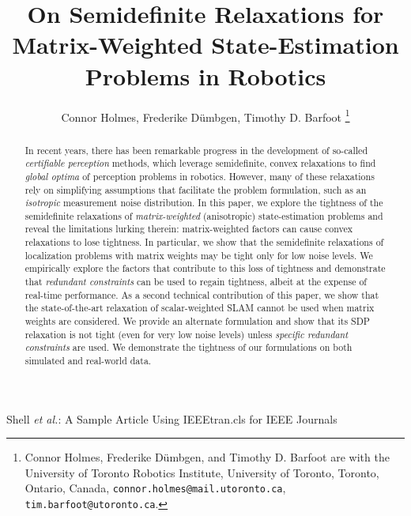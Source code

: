 \documentclass[lettersize,journal]{IEEEtran}
\begin{document}
\title{On Semidefinite Relaxations for Matrix-Weighted State-Estimation Problems in Robotics}

\author{Connor Holmes, Frederike D{\"u}mbgen, Timothy D. Barfoot\vspace*{-0.45in}
\thanks{Connor Holmes, Frederike D{\"u}mbgen, and Timothy D. Barfoot are with the University of Toronto Robotics Institute, University of Toronto, Toronto, Ontario, Canada, \texttt{connor.holmes@mail.utoronto.ca}, \texttt{tim.barfoot@utoronto.ca}.}}%

%
{Shell \MakeLowercase{\textit{et al.}}: A Sample Article Using IEEEtran.cls for IEEE Journals}




\maketitle

\begin{abstract}
In recent years, there has been remarkable progress in the development of so-called \emph{certifiable perception} methods, which leverage semidefinite, convex relaxations to find \emph{global optima} of perception problems in robotics. However, many of these relaxations rely on simplifying assumptions that facilitate the problem formulation, such as an \emph{isotropic} measurement noise distribution.
In this paper, we explore the tightness of the semidefinite relaxations of \emph{matrix-weighted} (anisotropic) state-estimation problems and reveal the limitations lurking therein: matrix-weighted factors can cause convex relaxations to lose tightness. In particular, we show that the semidefinite relaxations of localization problems with matrix weights may be tight only for low noise levels. We empirically explore the factors that contribute to this loss of tightness and demonstrate that \emph{redundant constraints} can be used to regain tightness, albeit at the expense of real-time performance.
As a second technical contribution of this paper, we show that the state-of-the-art relaxation of scalar-weighted SLAM cannot be used when matrix weights are considered. We provide an alternate formulation and show that its SDP relaxation is not tight (even for very low noise levels) unless \emph{specific redundant constraints} are used. 
We demonstrate the tightness of our formulations on both simulated and real-world data.

\end{abstract}
\end{document}
